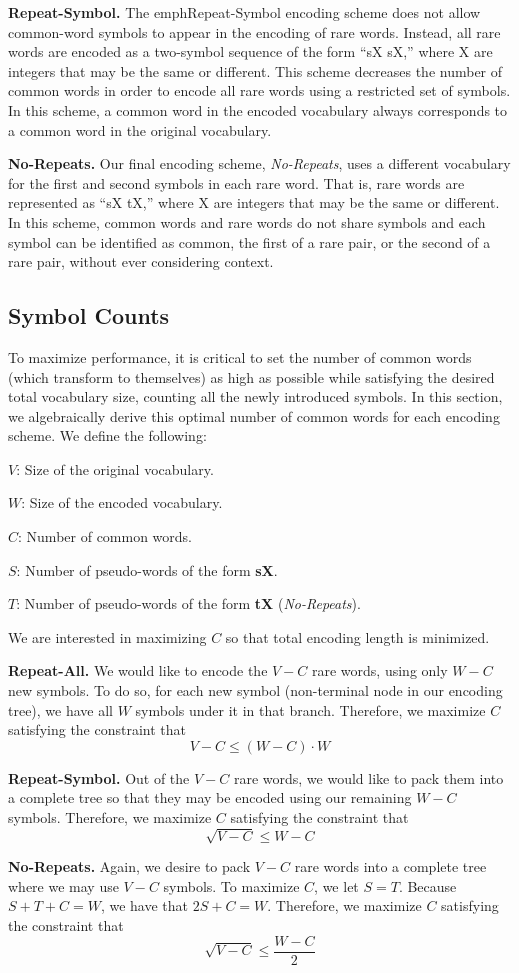 \noindent\textbf{Repeat-Symbol.}
The emph{Repeat-Symbol} encoding scheme does not allow common-word symbols to
appear in the encoding of rare words. Instead, all rare words are encoded as
a two-symbol sequence of the form ``sX sX,'' where X are integers that may be
the same or different. This scheme decreases the number of common words in
order to encode all rare words using a restricted set of symbols. In this scheme, a common word in the encoded vocabulary always corresponds to a common word
in the original vocabulary.

\noindent\textbf{No-Repeats.}
Our final encoding scheme, \emph{No-Repeats}, uses a different vocabulary for
the first and second symbols in each rare word. That is, rare words are
represented as ``sX tX,'' where X are integers that may be the same or
different.  In this scheme, common words and rare words do not share symbols
and each symbol can be identified as common, the first of a rare pair, or the
second of a rare pair, without ever considering context.

\subsection{Symbol Counts}
To maximize performance, it is critical to set the number of common words (which
transform to themselves) as high as possible while satisfying the desired total vocabulary size,
counting all the newly introduced symbols. In this section, we algebraically derive
this optimal number of common words for each encoding scheme. We define the following:
\begin{description}
\item{$V$:} Size of the original vocabulary.
\item{$W$:} Size of the encoded vocabulary.
\item{$C$:} Number of common words.
\item{$S$:} Number of pseudo-words of the form \textbf{sX}.
\item{$T$:} Number of pseudo-words of the form \textbf{tX} (\emph{No-Repeats}).
\end{description}

We are interested in maximizing $C$ so that total encoding length is minimized.

\noindent\textbf{Repeat-All.}
We would like to encode the $V - C$ rare words, using only $W - C$ new symbols.
To do so, for each new symbol (non-terminal node in our encoding tree), we have
all $W$ symbols under it in that branch. Therefore, we maximize $C$ satisfying
the constraint that
$$V - C \leq (W - C) \cdot W$$

\noindent\textbf{Repeat-Symbol.}
Out of the $V - C$ rare words, we would like to pack them into a complete tree
so that they may be encoded using our remaining $W - C$ symbols. Therefore, we
maximize $C$ satisfying the constraint that
$$\sqrt{V - C} \leq W - C$$

\noindent\textbf{No-Repeats.}
Again, we desire to pack $V - C$ rare words into a complete tree where we may
use $V - C$ symbols. To maximize $C$, we let $S = T$. Because $S + T + C = W$,
we have that $2S + C = W$. Therefore, we maximize $C$ satisfying the constraint
that
$$\sqrt{V - C} \leq \frac{W - C}{2}$$
